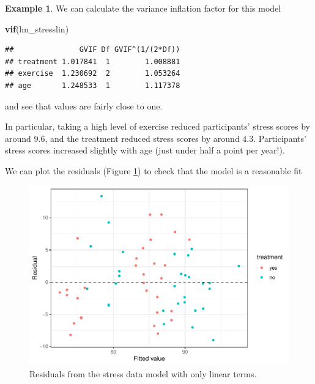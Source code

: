 \documentclass[
  openany]{book}
\newenvironment{Shaded}{\begin{snugshade}}{\end{snugshade}}
\newcommand{\FunctionTok}[1]{\textcolor[rgb]{0.13,0.29,0.53}{\textbf{#1}}}
\newcommand{\NormalTok}[1]{#1}
\theoremstyle{definition}
\theoremstyle{definition}
\newtheorem{example}{Example}[chapter]
\theoremstyle{definition}
\theoremstyle{definition}
\theoremstyle{remark}
\begin{document}
\begin{example}
We can calculate the variance inflation factor for this model

\begin{Shaded}
\begin{Highlighting}[]
\FunctionTok{vif}\NormalTok{(lm\_stresslin)}
\end{Highlighting}
\end{Shaded}

\begin{verbatim}
##               GVIF Df GVIF^(1/(2*Df))
## treatment 1.017841  1        1.008881
## exercise  1.230692  2        1.053264
## age       1.248533  1        1.117378
\end{verbatim}

and see that values are fairly close to one.

In particular, taking a high level of exercise reduced participants' stress scores by around 9.6, and the treatment reduced stress scores by around 4.3. Participants' stress scores increased slightly with age (just under half a point per year!).

We can plot the residuals (Figure \ref{fig:lmstressresid1}) to check that the model is a reasonable fit

\begin{figure}
\centering
\includegraphics{CT4H_notes_files/figure-latex/lmstressresid1-1.pdf}
\caption{\label{fig:lmstressresid1}Residuals from the stress data model with only linear terms.}
\end{figure}


\end{example}
\end{document}

